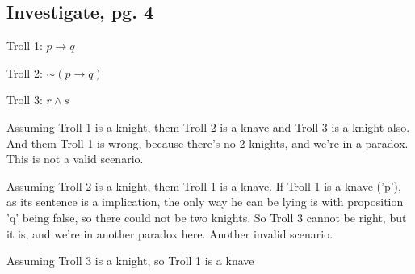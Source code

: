 \documentclass{article}
\begin{document}
	\subsection{Investigate, pg. 4}

	Troll 1: $p \rightarrow q$

	Troll 2: $\sim(p \rightarrow q)$

	Troll 3: $r \wedge s$

	Assuming Troll 1 is a knight, them Troll 2 is a knave and Troll 3 is a knight also. And them Troll 1 is wrong, because there's no 2 knights, and we're in a paradox. This is not a valid scenario.

	Assuming Troll 2 is a knight, them Troll 1 is a knave. If Troll 1 is a knave ('p'), as its sentence is a implication, the only way he can be lying is with proposition 'q' being false, so there could not be two knights. So Troll 3 cannot be right, but it is, and we're in another paradox here. Another invalid scenario.

	Assuming Troll 3 is a knight, so Troll 1 is a knave


	
	
\end{document}
